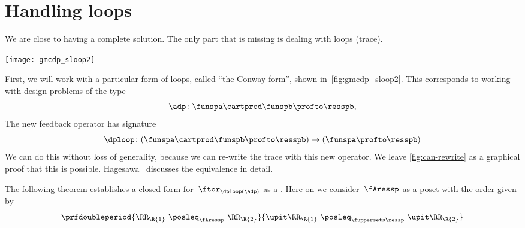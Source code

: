 \section{Handling loops}

We are close to having a complete solution.
The only part that is missing is dealing with loops (trace).

\begin{marginfigure}
    \texttt{[image: gmcdp\_sloop2]}
    \caption{}
    \label{fig:gmcdp_sloop2}
\end{marginfigure}

First, we will work with a particular form of loops, called ``the Conway form'',
shown in~\cref{fig:gmcdp_sloop2}.
This corresponds to working with design problems of the type
\begin{equation}
    \adp \colon \funspa \cartprod \funspb  \profto \resspb,
\end{equation}
The new feedback operator has signature
\begin{equation}
    \dploop\colon (\funspa \cartprod \funspb \profto \resspb) \to (\funspa \profto \resspb)
\end{equation}
%
We can do this without loss of generality, because we can re-write the trace
with this new operator.
We leave \cref{fig:can-rewrite} as a graphical proof that this is possible.
Hagesawa~\cite{hasegawa02uniformity} discusses the equivalence in detail.

\begin{figure*}[h]
    \hspace*{\fill}
    \hspace*{\fill}
    \hspace*{\fill}
    \caption{We can rewrite the trace in Conway's form.}
    \label{fig:can-rewrite}
\end{figure*}

The following theorem establishes a closed form for~$\ftor_{\dploop(\adp)}$ as a .
Here on we consider~$\fAressp$ as a poset with the order given by
\begin{equation}
    \prfdoubleperiod{
        \RR_\R{1} \  \posleq_{\fAressp} \ \RR_\R{2}
    }{
        \upit \RR_\R{1} \ \posleq_{\fuppersets \ressp}\  \upit \RR_\R{2}
    }
\end{equation}


